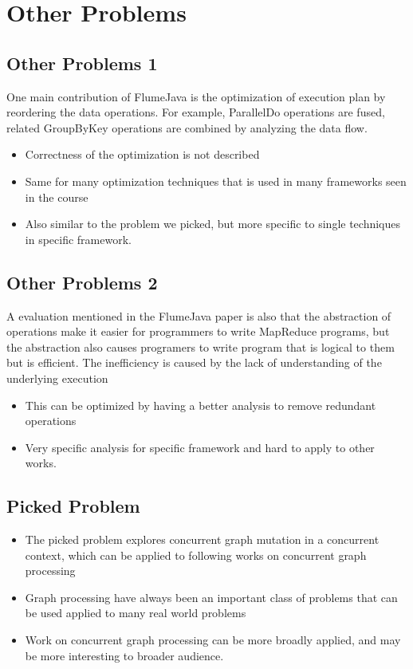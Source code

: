 \section{Other Problems}
\subsection{Other Problems 1}
\begin{frame}
One main contribution of FlumeJava is the optimization of execution plan by
reordering the data operations. For example, ParallelDo operations are fused,
related GroupByKey operations are combined by analyzing the data flow.
\begin{itemize}
  \item Correctness of the optimization is not described
  \item Same for many optimization techniques that is used in many frameworks
  seen in the course
  \item Also similar to the problem we picked, but more specific to single
  techniques in specific framework.
\end{itemize}
\end{frame}

\subsection{Other Problems 2}
\begin{frame}
A evaluation mentioned in the FlumeJava paper is also that the abstraction of
operations make it easier for programmers to write MapReduce programs, but the
abstraction also causes programers to write program that is logical to them but
is efficient. The inefficiency is caused by the lack of understanding of the
underlying execution
\begin{itemize}
  \item This can be optimized by having a better analysis to remove redundant
  operations
  \item Very specific analysis for specific framework and hard to apply to other
  works.
\end{itemize}
\end{frame}

\subsection{Picked Problem}
\begin{frame}
\begin{itemize}
  \item The picked problem explores concurrent graph mutation in a concurrent context,
which can be applied to following works on concurrent graph processing
  \item Graph processing have always been an important class of problems that
  can be used applied to many real world problems
  \item Work on concurrent graph processing can be more broadly applied, and may
  be more interesting to broader audience.
\end{itemize}
\end{frame}